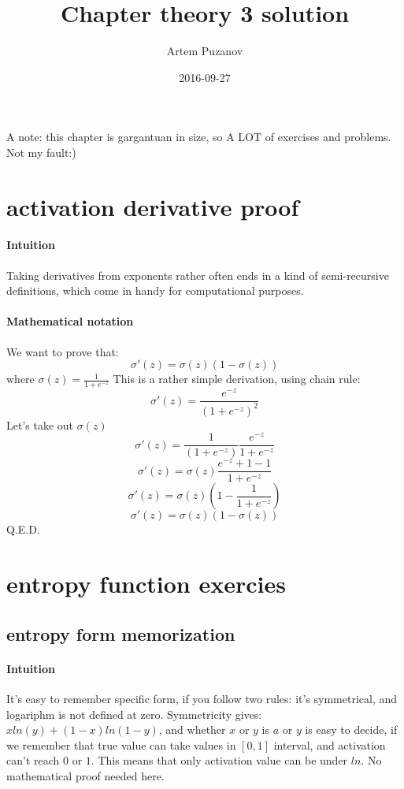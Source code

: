 \documentclass{article}
\title{Chapter theory 3 solution}
\date{2016-09-27}
\author{Artem Puzanov}
\begin{document}
\maketitle
{}
\newpage
{}

A note: this chapter is gargantuan in size, so A LOT of exercises and problems. Not my fault:)

\section{activation derivative proof}
\paragraph{Intuition}
Taking derivatives from exponents rather often ends in a kind of semi-recursive definitions, which come in handy for computational purposes.
\paragraph{Mathematical notation}
We want to prove that:
$$\sigma'(z) = \sigma(z)(1 - \sigma(z))$$
where $\sigma(z) = \frac{1}{1+e^{-z}}$
This is a rather simple derivation, using chain rule:
$$\sigma'(z) = \frac{e^{-z}}{(1 + e^{-z})^2}$$
Let's take out $\sigma(z)$
$$\sigma'(z) = \frac{1}{(1 + e^{-z})}\frac{e^{-z}}{1+e^{-z}}$$
$$\sigma'(z) = \sigma(z)\frac{e^{-z} + 1 - 1}{1+e^{-z}}$$
$$\sigma'(z) = \sigma(z)(1 - \frac{1}{1+e^{-z}})$$
$$\sigma'(z) = \sigma(z)(1 - \sigma(z))$$
Q.E.D.

\section{entropy function exercies}
\subsection{entropy form memorization}
\paragraph{Intuition}
It's easy to remember specific form, if you follow two rules: it's symmetrical, and logariphm is not defined at zero.
Symmetricity gives: $xln(y) + (1-x)ln(1-y)$, and whether $x$ or $y$ is $a$ or $y$ is easy to decide, if we remember that
true value can take values in $[0,1]$ interval, and activation can't reach $0$ or $1$. 
This means that only activation value can be under $ln$.
No mathematical proof needed here.
\end{document}
